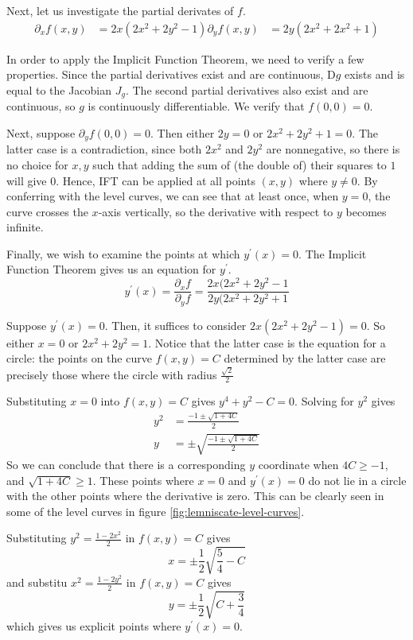 \documentclass[letterpaper,11pt]{article}
\newcommand{\D}{\mathrm{D}}
\begin{document}
Next, let us investigate the partial derivates of $f$.
\begin{align*}
    \partial_x f(x, y) &= 2x(2x^2 + 2y^2 - 1)
    \partial_y f(x, y) &= 2y(2x^2 + 2x^2 + 1)
\end{align*}

In order to apply the Implicit Function Theorem, we need to verify a few
properties. Since the partial derivatives exist and are continuous,
$\D g$ exists and is equal to the Jacobian $J_g$. The second partial
derivatives also exist and are continuous, so $g$ is continuously
differentiable. We verify that $f(0, 0) = 0$.

Next, suppose $\partial_y f(0, 0) = 0$. Then either $2y = 0$ or
$2x^2 + 2y^2 + 1 = 0$. The latter case is a contradiction, since both $2x^2$
and $2y^2$ are nonnegative, so there is no choice for $x, y$ such that adding
the sum of (the double of) their squares to $1$ will give $0$. Hence, IFT can
be applied at all points $(x, y)$ where $y \neq 0$. By conferring with the
level curves, we can see that at least once, when $y = 0$, the curve crosses
the $x$-axis vertically, so the derivative with respect to $y$ becomes
infinite.

Finally, we wish to examine the points at which $y^\prime(x) = 0$.
The Implicit Function Theorem gives us an equation for $y^\prime$.
\begin{equation*}
    y^\prime(x) = \frac{\partial_x f}{\partial_y f}
    = \frac{2x(2x^2 + 2y^2 - 1}{2y(2x^2 + 2y^2 + 1}
\end{equation*}

Suppose $y^\prime(x) = 0$. Then, it suffices to consider
$2x(2x^2 + 2y^2 - 1) = 0$. So either $x = 0$ or $2x^2 + 2y^2 = 1$. Notice that
the latter case is the equation for a circle: the points on the curve
$f(x, y) = C$ determined by the latter case are precisely those where the
circle with radius $\frac{\sqrt{2}}{2}$

Substituting $x = 0$ into $f(x, y) = C$ gives $y^4 + y^2 - C = 0$. Solving for
$y^2$ gives
\begin{align*}
    y^2 &= \frac{-1 \pm \sqrt{1 + 4C}}{2} \\
    y &= \pm \sqrt{ \frac{-1 \pm \sqrt{1 + 4C}}{2} }
\end{align*}
So we can conclude that there is a corresponding $y$ coordinate when
$4C \geq -1$, and $\sqrt{1 + 4C} \geq 1$. These points where $x = 0$ and
$y^\prime(x) = 0$ do not lie in a circle with the other points where the
derivative is zero. This can be clearly seen in some of the level curves in
figure \ref{fig:lemniscate-level-curves}.

Substituting $y^2 = \frac{1 - 2x^2}{2}$ in $f(x, y) = C$ gives
\begin{equation*}
    x = \pm \frac{1}{2} \sqrt{\frac{5}{4} - C}
\end{equation*}
and substitu $x^2 = \frac{1 - 2y^2}{2}$ in $f(x, y) = C$ gives
\begin{equation*}
    y = \pm \frac{1}{2} \sqrt{C + \frac{3}{4}}
\end{equation*}
which gives us explicit points where $y^\prime(x) = 0$.
\end{document}
